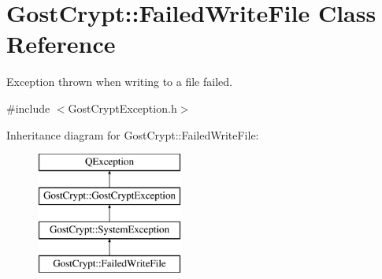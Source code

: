 \hypertarget{class_gost_crypt_1_1_failed_write_file}{}\section{Gost\+Crypt\+:\+:Failed\+Write\+File Class Reference}
\label{class_gost_crypt_1_1_failed_write_file}


Exception thrown when writing to a file failed.  




{\ttfamily \#include $<$Gost\+Crypt\+Exception.\+h$>$}

Inheritance diagram for Gost\+Crypt\+:\+:Failed\+Write\+File\+:\begin{figure}[H]
\begin{center}
\leavevmode
\includegraphics[height=4.000000cm]{class_gost_crypt_1_1_failed_write_file}
\end{center}
\end{figure}
